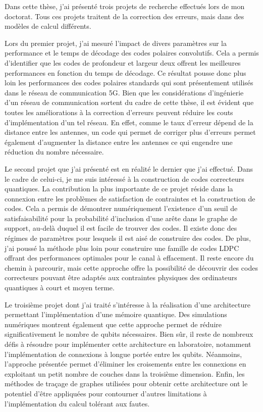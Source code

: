 \begin{comment}
\end{comment}

\Conclusion %

Dans cette thèse,
j'ai présenté trois projets de recherche effectués lors de mon doctorat.
Tous ces projets traitent de la correction des erreurs,
mais dans des modèles de calcul différents.

Lors du premier projet,
j'ai mesuré l'impact de divers paramètres sur la performance et le temps de décodage
des codes polaires convolutifs.
Cela a permis d'identifier que les codes de profondeur et largeur deux offrent les
meilleures performances en fonction du temps de décodage.
Ce résultat pousse donc plus loin les performances des codes polaires standards
qui sont présentement utilisés dans le réseau de communication 5G.
Bien que les considérations d'ingénierie d'un réseau de communication sortent du cadre de cette thèse,
il est évident que toutes les améliorations à la correction d'erreurs peuvent réduire les 
couts d'implémentation d'un tel réseau.
En effet,
comme le taux d'erreur dépend de la distance entre les antennes,
un code qui permet de corriger plus d'erreurs permet également d'augmenter la distance
entre les antennes ce qui engendre une réduction du nombre nécessaire.

Le second projet que j'ai présenté est en réalité le dernier que j'ai effectué.
Dans le cadre de celui-ci,
je me suis intéressé à la construction de codes correcteurs quantiques.
La contribution la plus importante de ce projet réside dans la connexion
entre les problèmes de satisfaction de contraintes et la construction de codes.
Cela a permis de démontrer numériquement l'existence d'un seuil de satisfaisabilité
pour la probabilité d'inclusion d'une arête dans le graphe de support,
au-delà duquel il est facile de trouver des codes.
Il existe donc des régimes de paramètres pour lesquels il est aisé de construire des codes.
De plus,
j'ai poussé la méthode plus loin pour construire une famille de codes LDPC offrant des 
performances optimales pour le canal à effacement.
Il reste encore du chemin à parcourir,
mais cette approche offre la possibilité de découvrir des codes correcteurs pouvant être
adaptés aux contraintes physiques des ordinateurs quantiques à court et moyen terme.

Le troisième projet dont j'ai traité s'intéresse à la réalisation d'une architecture
permettant l'implémentation d'une mémoire quantique.
Des simulations numériques montrent également que cette approche permet de réduire significativement
le nombre de qubits nécessaires.
Bien sûr,
il reste de nombreux défis à résoudre pour implémenter cette architecture en laboratoire,
notamment l'implémentation de connexions à longue portée entre les qubits.
Néanmoins,
l'approche présentée permet d'éliminer les croisements entre les connexions en exploitant
un petit nombre de couches dans la troisième dimension.
Enfin,
les méthodes de traçage de graphes utilisées pour obtenir cette architecture 
ont le potentiel d'être appliquées pour contourner d'autres limitations à l'implémentation
du calcul tolérant aux fautes.

